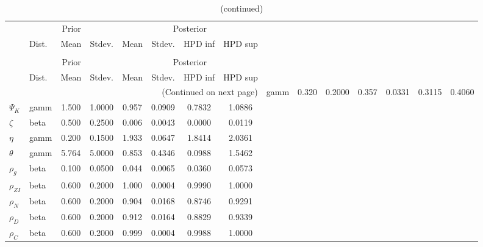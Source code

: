  
\begin{center}
\begin{longtable}{llcccccc} 
\caption{Results from Metropolis-Hastings (parameters)}
 \label{Table:MHPosterior:1}\\
\toprule 
  & \multicolumn{3}{c}{Prior}  &  \multicolumn{4}{c}{Posterior} \\
  \cmidrule(r{.75em}){2-4} \cmidrule(r{.75em}){5-8}
  & Dist. & Mean  & Stdev. & Mean & Stdev. & HPD inf & HPD sup\\
\midrule \endfirsthead 
\caption{(continued)}\\\toprule 
  & \multicolumn{3}{c}{Prior}  &  \multicolumn{4}{c}{Posterior} \\
  \cmidrule(r{.75em}){2-4} \cmidrule(r{.75em}){5-8}
  & Dist. & Mean  & Stdev. & Mean & Stdev. & HPD inf & HPD sup\\
\midrule \endhead 
\bottomrule \multicolumn{8}{r}{(Continued on next page)} \endfoot 
\bottomrule \endlastfoot 
${\sigma_a}$ & gamm &   0.320 & 0.2000 &   0.357& 0.0331 &  0.3115 &  0.4060 \\ 
${\Psi_K}$ & gamm &   1.500 & 1.0000 &   0.957& 0.0909 &  0.7832 &  1.0886 \\ 
${\zeta}$ & beta &   0.500 & 0.2500 &   0.006& 0.0043 &  0.0000 &  0.0119 \\ 
${\eta}$ & gamm &   0.200 & 0.1500 &   1.933& 0.0647 &  1.8414 &  2.0361 \\ 
${\theta}$ & gamm &   5.764 & 5.0000 &   0.853& 0.4346 &  0.0988 &  1.5462 \\ 
${\rho_g}$ & beta &   0.100 & 0.0500 &   0.044& 0.0065 &  0.0360 &  0.0573 \\ 
${\rho_{ZI}}$ & beta &   0.600 & 0.2000 &   1.000& 0.0004 &  0.9990 &  1.0000 \\ 
${\rho_N}$ & beta &   0.600 & 0.2000 &   0.904& 0.0168 &  0.8746 &  0.9291 \\ 
${\rho_D}$ & beta &   0.600 & 0.2000 &   0.912& 0.0164 &  0.8829 &  0.9339 \\ 
${\rho_C}$ & beta &   0.600 & 0.2000 &   0.999& 0.0004 &  0.9988 &  1.0000 \\ 
\end{longtable}
 \end{center}
